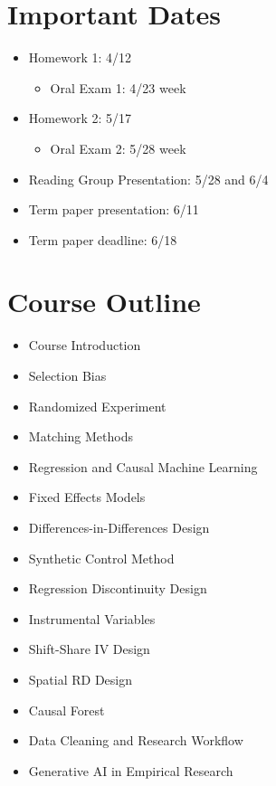 \documentclass[11pt]{article}
\begin{document}
\section*{Important Dates}

\begin{itemize}
\item Homework 1: 4/12
\begin{itemize}
\item Oral Exam 1: 4/23 week
\end{itemize}
\item Homework 2: 5/17
\begin{itemize}
\item Oral Exam 2: 5/28 week
\end{itemize}
\item Reading Group Presentation: 5/28 and 6/4
\item Term paper presentation: 6/11
\item Term paper deadline: 6/18
\end{itemize}

\section*{Course Outline}

\begin{itemize}
\item Course Introduction
\item Selection Bias
\item Randomized Experiment 
\item Matching Methods
\item Regression and Causal Machine Learning
\item Fixed Effects Models
\item Differences-in-Differences Design
\item Synthetic Control Method
\item Regression Discontinuity Design
\item Instrumental Variables
\item Shift-Share IV Design
\item Spatial RD Design
\item Causal Forest
\item Data Cleaning and Research Workflow
\item Generative AI in Empirical Research
\end{itemize}
\end{document}

